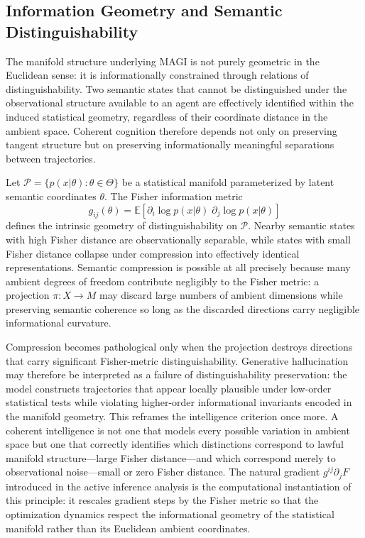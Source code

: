 \documentclass[11pt,a4paper,twocolumn]{article}
\begin{document}
\subsection{Information Geometry and Semantic Distinguishability}

The manifold structure underlying MAGI is not purely geometric in the
Euclidean sense: it is informationally constrained through relations
of distinguishability. Two semantic states that cannot be distinguished
under the observational structure available to an agent are effectively
identified within the induced statistical geometry, regardless of their
coordinate distance in the ambient space. Coherent cognition therefore
depends not only on preserving tangent structure but on preserving
informationally meaningful separations between trajectories.

Let $\mathcal{P} = \{p(x|\theta) : \theta \in \Theta\}$ be a
statistical manifold parameterized by latent semantic coordinates
$\theta$. The Fisher information metric
\[
g_{ij}(\theta)
=
\mathbb{E}
\left[
\partial_i \log p(x|\theta)
\;
\partial_j \log p(x|\theta)
\right]
\]
defines the intrinsic geometry of distinguishability on $\mathcal{P}$.
Nearby semantic states with high Fisher distance are observationally
separable, while states with small Fisher distance collapse under
compression into effectively identical representations. Semantic
compression is possible at all precisely because many ambient degrees
of freedom contribute negligibly to the Fisher metric: a projection
$\pi : X \to M$ may discard large numbers of ambient dimensions while
preserving semantic coherence so long as the discarded directions
carry negligible informational curvature.

Compression becomes pathological only when the projection destroys
directions that carry significant Fisher-metric distinguishability.
Generative hallucination may therefore be interpreted as a failure of
distinguishability preservation: the model constructs trajectories
that appear locally plausible under low-order statistical tests while
violating higher-order informational invariants encoded in the
manifold geometry. This reframes the intelligence criterion once
more. A coherent intelligence is not one that models every possible
variation in ambient space but one that correctly identifies which
distinctions correspond to lawful manifold structure---large Fisher
distance---and which correspond merely to observational noise---small
or zero Fisher distance. The natural gradient $g^{ij}\partial_j F$
introduced in the active inference analysis is the computational
instantiation of this principle: it rescales gradient steps by the
Fisher metric so that the optimization dynamics respect the
informational geometry of the statistical manifold rather than its
Euclidean ambient coordinates.
\end{document}
